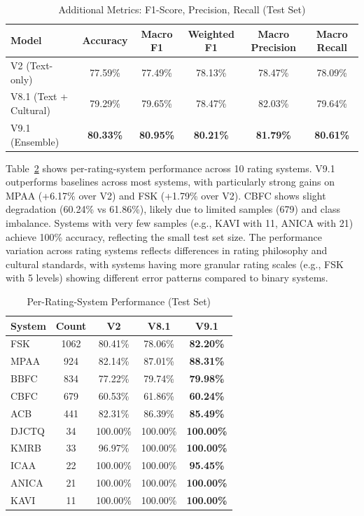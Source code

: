 \documentclass[11pt]{article}
\begin{document}
\begin{table}[h]
\centering
\caption{Additional Metrics: F1-Score, Precision, Recall (Test Set)}
\label{tab:f1_metrics}
\begin{tabular}{lccccc}
\toprule
Model & Accuracy & Macro F1 & Weighted F1 & Macro Precision & Macro Recall \\
\midrule
V2 (Text-only) & 77.59\% & 77.49\% & 78.13\% & 78.47\% & 78.09\% \\
V8.1 (Text + Cultural) & 79.29\% & 79.65\% & 78.47\% & 82.03\% & 79.64\% \\
V9.1 (Ensemble) & \textbf{80.33\%} & \textbf{80.95\%} & \textbf{80.21\%} & \textbf{81.79\%} & \textbf{80.61\%} \\
\bottomrule
\end{tabular}
\end{table}

Table~\ref{tab:per_system} shows per-rating-system performance across 10 rating systems. V9.1 outperforms baselines across most systems, with particularly strong gains on MPAA (+6.17\% over V2) and FSK (+1.79\% over V2). CBFC shows slight degradation (60.24\% vs 61.86\%), likely due to limited samples (679) and class imbalance. Systems with very few samples (e.g., KAVI with 11, ANICA with 21) achieve 100\% accuracy, reflecting the small test set size. The performance variation across rating systems reflects differences in rating philosophy and cultural standards, with systems having more granular rating scales (e.g., FSK with 5 levels) showing different error patterns compared to binary systems.

\begin{table}[h]
\centering
\caption{Per-Rating-System Performance (Test Set)}
\label{tab:per_system}
\footnotesize
\begin{tabular}{lcccc}
\toprule
System & Count & V2 & V8.1 & V9.1 \\
\midrule
FSK & 1062 & 80.41\% & 78.06\% & \textbf{82.20\%} \\
MPAA & 924 & 82.14\% & 87.01\% & \textbf{88.31\%} \\
BBFC & 834 & 77.22\% & 79.74\% & \textbf{79.98\%} \\
CBFC & 679 & 60.53\% & 61.86\% & \textbf{60.24\%} \\
ACB & 441 & 82.31\% & 86.39\% & \textbf{85.49\%} \\
DJCTQ & 34 & 100.00\% & 100.00\% & \textbf{100.00\%} \\
KMRB & 33 & 96.97\% & 100.00\% & \textbf{100.00\%} \\
ICAA & 22 & 100.00\% & 100.00\% & \textbf{95.45\%} \\
ANICA & 21 & 100.00\% & 100.00\% & \textbf{100.00\%} \\
KAVI & 11 & 100.00\% & 100.00\% & \textbf{100.00\%} \\
\bottomrule
\end{tabular}
\end{table}
\end{document}
